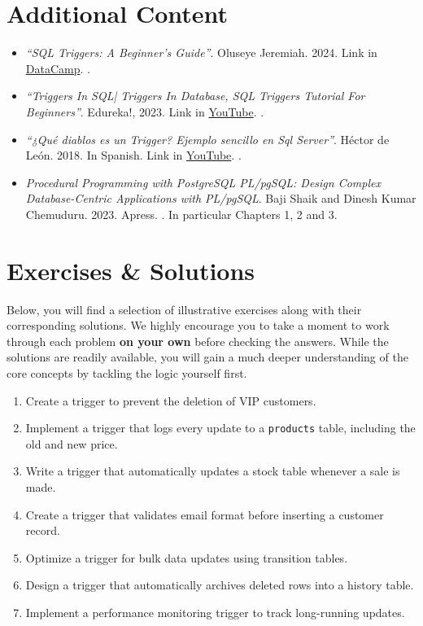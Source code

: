 \documentclass{article}
\begin{document}
\section{Additional Content}

\begin{itemize}
    \item \textit{``SQL Triggers: A Beginner's Guide''}. Oluseye Jeremiah. 2024. Link in  \href{https://www.datacamp.com/tutorial/sql-triggers}{DataCamp}. \cite{datacamp_sql_triggers}.
    \item \textit{``Triggers In SQL| Triggers In Database, SQL Triggers Tutorial For Beginners''}. Edureka!, 2023. Link in \href{https://www.youtube.com/watch?v=MhsL8ke7IJY}{YouTube}. \cite{edureka_sql_triggers}.
    \item \textit{``¿Qué diablos es un Trigger? Ejemplo sencillo en Sql Server''}. Héctor de León. 2018. In Spanish. Link in  \href{https://www.youtube.com/watch?v=uTx7xd4ojkk}{YouTube}. \cite{hdeleon_trigger_sqlserver}.
    \item \textit{Procedural Programming with PostgreSQL PL/pgSQL: Design Complex Database-Centric Applications with PL/pgSQL}.  Baji Shaik and Dinesh Kumar Chemuduru. 2023. Apress. \cite{Shaik2023Procedural}.  In particular Chapters 1, 2 and 3.
\end{itemize}

\section{Exercises \& Solutions}
Below, you will find a selection of illustrative exercises along with their corresponding solutions. We highly encourage you to take a moment to work through each problem \textbf{on your own} before checking the answers. While the solutions are readily available, you will gain a much deeper understanding of the core concepts by tackling the logic yourself first.

\begin{enumerate}
    \item Create a trigger to prevent the deletion of VIP customers.
    \item Implement a trigger that logs every update to a \texttt{products} table, including the old and new price.
    \item Write a trigger that automatically updates a stock table whenever a sale is made.
    \item Create a trigger that validates email format before inserting a customer record.
    \item Optimize a trigger for bulk data updates using transition tables.
    \item Design a trigger that automatically archives deleted rows into a history table.
    \item Implement a performance monitoring trigger to track long-running updates.
\end{enumerate}
\end{document}
